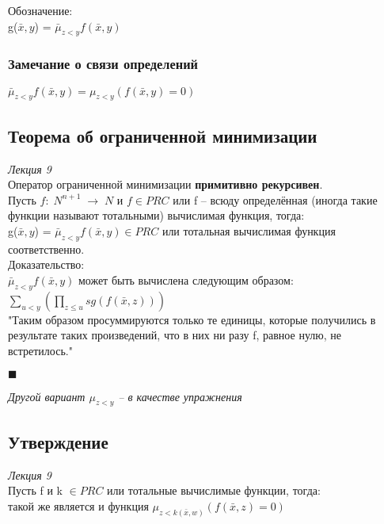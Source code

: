 \documentclass{article}
\begin{document}
            Обозначение:\\
            g($\bar x, y$) = $\bar \mu_{z < y} f(\bar x, y)$\\
            
        \subsubsection{Замечание о связи определений}
        $\bar \mu_{z < y} f(\bar x, y) = \mu_{z < y} (f(\bar x, y) = 0)$
    
    \subsection{Теорема об ограниченной минимизации}
    \emph{Лекция 9}\\
        
        Оператор ограниченной минимизации \textbf{примитивно рекурсивен}.\\
        
        Пусть $f:\; N^{n+1}\; \rightarrow\; N$ и $f \in PRC$ или f -- всюду определённая (иногда такие функции называют тотальными) вычислимая функция, тогда:\\
        
        g($\bar x, y$) = $\bar \mu_{z < y} f(\bar x, y) \in PRC$ или тотальная вычислимая функция соответственно.\\
        
        Доказательство:\\
        $\bar \mu_{z < y} f(\bar x, y)$ может быть вычислена следующим образом:\\
        
        $\sum\limits_{u < y}(\prod\limits_{z \leq u}sg(f(\bar x , z)))$\\
        "Таким образом просуммируются только те единицы, которые получились в результате таких произведений, что в них ни разу f, равное нулю, не встретилось."
        \begin{flushright}
            $\blacksquare$\\
        \end{flushright}
        
        \emph{Другой вариант $\mu_{z < y}$ -- в качестве упражнения}
    
    \subsection{Утверждение}
    \emph{Лекция 9}\\
        Пусть f и k $\in PRC$ или тотальные вычислимые функции, тогда:\\
        такой же является и функция $\mu_{z < k(\bar x, w)}(f(\bar x, z) = 0)$
        
\end{document}
